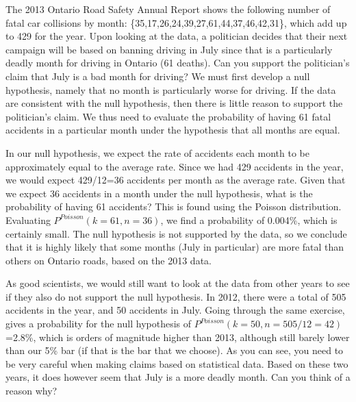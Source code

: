 \begin{example}{}{The 2013 Ontario Road Safety Annual Report shows the following number of fatal car collisions by month: \{35,17,26,24,39,27,61,44,37,46,42,31\}, which add up to 429 for the year. Upon looking at the data, a politician decides that their next campaign will be based on banning driving in July since that is a particularly deadly month for driving in Ontario (61 deaths). Can you support the politician's claim that July is a bad month for driving?}{}
We must first develop a null hypothesis, namely that no month is particularly worse for driving. If the data are consistent with the null hypothesis, then there is little reason to support the politician's claim. We thus need to evaluate the probability of having 61 fatal accidents in a particular month under the hypothesis that all months are equal. 

In our null hypothesis, we expect the rate of accidents each month to be approximately equal to the average rate. Since we had 429 accidents in the year, we would expect 429/12=36 accidents per month as the average rate. Given that we expect 36 accidents in a month under the null hypothesis, what is the probability of having 61 accidents? This is found using the Poisson distribution. Evaluating $P^{Poisson}(k=61,n=36)$, we find a probability of 0.004\%, which is certainly small. The null hypothesis is not supported by the data, so we conclude that it is highly likely that some months (July in particular) are more fatal than others on Ontario roads, based on the 2013 data.

As good scientists, we would still want to look at the data from other years to see if they also do not support the null hypothesis. In 2012, there were a total of 505 accidents in the year, and 50 accidents in July. Going through the same exercise, gives a probability for the null hypothesis of $P^{Poisson}(k=50,n=505/12=42)$=2.8\%, which is orders of magnitude higher than 2013, although still barely lower than our 5\% bar (if that is the bar that we choose). As you can see, you need to be very careful when making claims based on statistical data. Based on these two years, it does however seem that July is a more deadly month. Can you think of a reason why?
\end{example}


